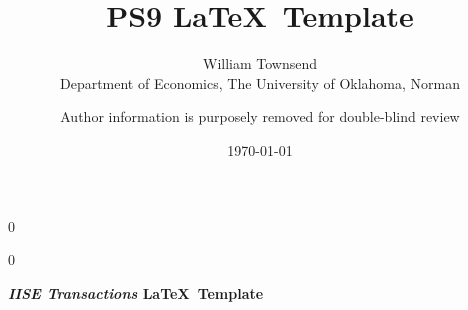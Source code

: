 \documentclass[12pt]{article}
\newcommand{\blind}{0}
\begin{document}
		
		\def\spacingset#1{\renewcommand{\baselinestretch}%
			{#1}\small\normalsize} \spacingset{1}
		
		\blind
		{
			\title{\bf PS9}
			
			\author{ William Townsend  \\
			Department of Economics, The University of Oklahoma, Norman\\
             }
			\date{\today}
			\maketitle
		} \fi
		
		\blind
		{

            \title{\bf \emph{} \LaTeX \ Template}
			\author{Author information is purposely removed for double-blind review}
			
\bigskip
			\bigskip
			\bigskip
			\begin{center}
				{\LARGE\bf \emph{IISE Transactions} \LaTeX \ Template}
			\end{center}
			\medskip
		} \fi
		\bigskip
		
%		
%			
%
\end{document}
